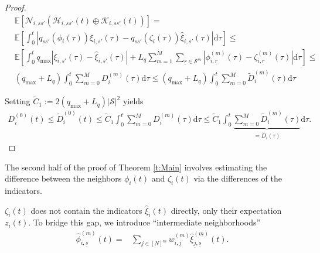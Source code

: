 \documentclass{article}
\newcommand{\E}{\mathbb{E}}
\renewcommand{\d}{\mathrm{d}}
\newcommand{\1}[1]{{\mathds{1}}_{\left\{#1\right\}}}
\newcommand{\K}{\mathcal{K}}
\newcommand{\N}{\mathcal{N}}
\newcommand{\HH}{\mathcal{H}}
\renewcommand{\S}{\mathcal{S}}
\newcommand{\remm}[1]{{#1}}
\begin{document}
\begin{proof}
		\begin{align*}
			&\E \left[\N_{i,ss'} \left(\HH_{i,ss'}(t) \oplus \K_{i,ss'}(t)  \right) \right]=\\
			&\E \left[\int_{0}^{t} \left|q_{ss'}\left(\phi_{i}(\tau) \right)\xi_{i,s'}(\tau)-q_{ss'}\left(\remm{\zeta_i(\tau)} \right)\hat{\xi}_{i,s'}(\tau) \right| \d \tau \right]  \leq \\
			& \E \left[ \int_{0}^{t} q_{\max} \left|\xi_{i,s'}(\tau)-\hat{\xi}_{i,s'}(\tau) \right|+L_{q}\sum_{m=1}^{M}\sum_{\underline{r} \in \S^m} \left|\phi_{i,\underline{r}}^{(m)}(\tau)-\remm{\zeta_{i,\underline{r}}^{(m)}(\tau)} \right| \d \tau \right] \leq \\
			& \left(q_{\max}+L_{q}\right)\int_{0}^{t} \sum_{m=0}^{M}D_{i}^{(m)}(\tau) \d \tau \leq \left(q_{\max}+L_{q}\right)\int_{0}^{t} \sum_{m=0}^{M}\tilde{D}_{i}^{(m)}(\tau) \d \tau
		\end{align*}
		
		Setting $\tilde{C}_1:=2\left(q_{\max}+L_q\right)\left| \S \right|^2$ yields
		\begin{align*}
			D_{i}^{(0)}(t) \leq \tilde{D}_{i}^{(0)}(t) \leq \tilde{C}_1 \int_{0}^{t} \sum_{m=0}^{M}D_{i}^{(m)}(\tau) \d \tau \leq \tilde{C}_1 \int_{0}^{t} \underbrace{\sum_{m=0}^{M}\tilde{D}_{i}^{(m)}(\tau)}_{=\tilde{D}_{i}(\tau)} \d \tau.
		\end{align*}  	
	\end{proof}
	
	The second half of the proof of Theorem \ref{t:Main} involves estimating the difference between the neighbors $\phi_{i}(t)$ and $\zeta_{i}(t)$ via the differences of the indicators.
	
	$\zeta_{i}(t)$ does not contain the indicators $\hat{\xi}_{i}(t)$ directly, only their expectation $z_{i}(t)$. To bridge this gap, we introduce ``intermediate neighborhoods''
	\begin{align*}
		\hat{\phi}_{i,\underline{s}}^{(m)}(t)=&\sum_{\underline{j} \in [N]^m}w_{i, \underline{j}}^{(m)} \hat{\xi}_{\underline{j},\underline{s}}^{(m)}(t).
	\end{align*}
	
\end{document}

